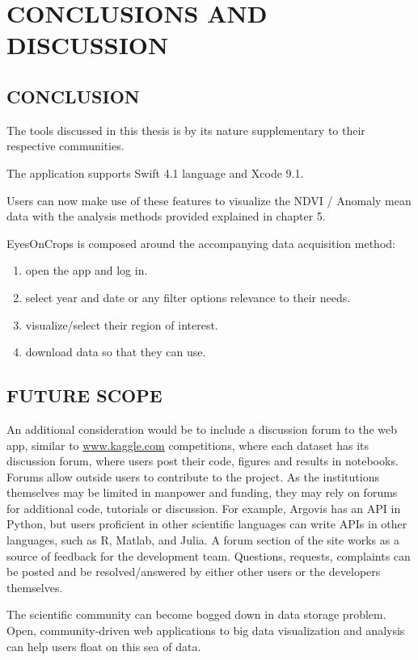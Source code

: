 \chapter{CONCLUSIONS AND DISCUSSION}
\label{chap:conclusion}

\section{CONCLUSION}

The tools discussed in this thesis is by its nature supplementary to their respective communities.

The application supports Swift 4.1 language and Xcode 9.1.

Users can now make use of these features to visualize the NDVI / Anomaly mean data with the analysis methods provided explained in chapter 5. 

EyesOnCrops is composed around the accompanying data acquisition method:
\begin{enumerate}
  \item open the app and log in. 
  \item select year and date or any filter options relevance to their needs.
  \item visualize/select their region of interest.
  \item download data so that they can use.
\end{enumerate}

\section{FUTURE SCOPE}

An additional consideration would be to include a discussion forum to the web app, similar to \url{www.kaggle.com} \cite{kaggle} competitions, where each dataset has its discussion forum, where users post their code, figures and results in notebooks. Forums allow outside users to contribute to the project. As the institutions themselves may be limited in manpower and funding, they may rely on forums for additional code, tutorials or discussion. For example, Argovis has an API in Python, but users proficient in other scientific languages can write APIs in other languages, such as R, Matlab, and Julia. A forum section of the site works as a source of feedback for the development team. Questions, requests, complaints can be posted and be resolved/answered by either other users or the developers themselves.

The scientific community can become bogged down in data storage problem. Open, community-driven web applications to big data visualization and analysis can help users float on this sea of data.